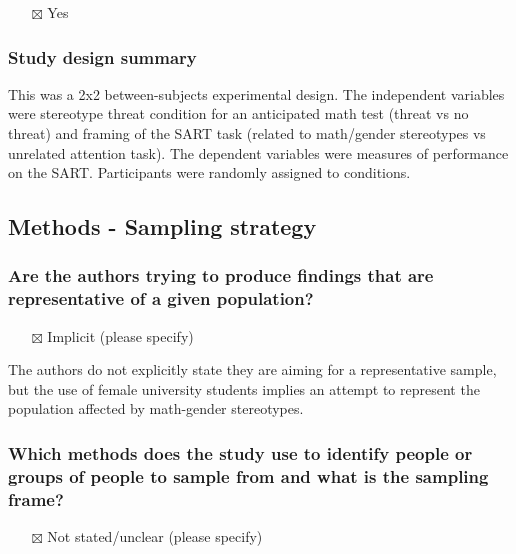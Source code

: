 \documentclass[
  doc, a4paper]{apa7}
\providecommand{\tightlist}{%
  \setlength{\itemsep}{0pt}\setlength{\parskip}{0pt}}
\begin{document}
\begin{itemize}
\tightlist
\item[$\boxtimes$]
  Yes
\end{itemize}

\subsubsection{Study design summary}\label{study-design-summary}

This was a 2x2 between-subjects experimental design. The independent variables were stereotype threat condition for an anticipated math test (threat vs no threat) and framing of the SART task (related to math/gender stereotypes vs unrelated attention task). The dependent variables were measures of performance on the SART. Participants were randomly assigned to conditions.

\subsection{Methods - Sampling strategy}\label{methods---sampling-strategy}

\subsubsection{Are the authors trying to produce findings that are representative of a given population?}\label{are-the-authors-trying-to-produce-findings-that-are-representative-of-a-given-population}

\begin{itemize}
\tightlist
\item[$\boxtimes$]
  Implicit (please specify)
\end{itemize}

The authors do not explicitly state they are aiming for a representative sample, but the use of female university students implies an attempt to represent the population affected by math-gender stereotypes.

\subsubsection{Which methods does the study use to identify people or groups of people to sample from and what is the sampling frame?}\label{which-methods-does-the-study-use-to-identify-people-or-groups-of-people-to-sample-from-and-what-is-the-sampling-frame}

\begin{itemize}
\tightlist
\item[$\boxtimes$]
  Not stated/unclear (please specify)
\end{itemize}
\end{document}
